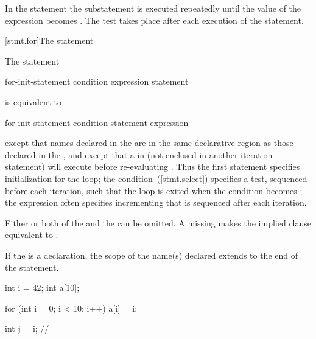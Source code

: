 \pnum
In the  statement the substatement is executed repeatedly
until the value of the expression becomes . The test takes
place after each execution of the statement.

[stmt.for]{The  statement}%

\pnum
The  statement

\begin{ncbnf}
 for-init-statement condition\opt{} \terminal{;} expression\opt{} \terminal{)} statement
\end{ncbnf}

is equivalent to

\begin{ncbnftab}
\terminal{\{}\br
\>for-init-statement\br
\> condition \terminal{) \{}\br
\>\>statement\br
\>\>expression \terminal{;}\br
\>\terminal{\}}\br
\terminal{\}}
\end{ncbnftab}

except that names declared in the  are in
the same declarative region as those declared in the
, and except that a
%
 in  (not enclosed in another
iteration statement) will execute  before
re-evaluating .
\enternote
Thus the first statement specifies initialization for the loop; the
condition~(\ref{stmt.select}) specifies a test, sequenced before each
iteration, such that the loop is exited when the condition becomes
; the expression often specifies incrementing that is
sequenced after each iteration.
\exitnote

\pnum
Either or both of the 
and the  can be omitted.
A missing 
makes the implied  clause
equivalent to .

\pnum
{}%
%
If the  is a declaration, the scope of the
name(s) declared extends to the end of the  statement.
\enterexample

\begin{codeblock}
int i = 42;
int a[10];

for (int i = 0; i < 10; i++)
  a[i] = i;

int j = i;          // 
\end{codeblock}
\exitexample

